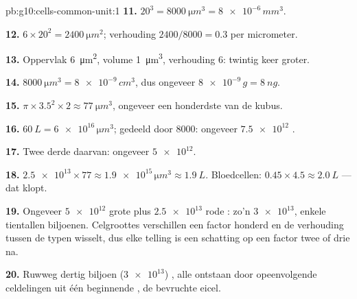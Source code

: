 \begin{solution}{pb:g10:cells-common-unit:1}
\textbf{11.} $20^3 = \qty{8000}{\micro m^3} = \num{8e-6}\,\unit{mm^3}$.

\textbf{12.} $6 \times 20^2 = \qty{2400}{\micro m^2}$; verhouding
$2400/8000 = 0.3$ per micrometer.

\textbf{13.} Oppervlak \qty{6}{\micro m^2}, volume \qty{1}{\micro m^3},
verhouding 6: twintig keer groter.

\textbf{14.} $\qty{8000}{\micro m^3} = \num{8e-9}\,\unit{cm^3}$, dus
ongeveer $\num{8e-9}\,\unit{g} = \qty{8}{ng}$.

\textbf{15.} $\pi \times 3.5^2 \times 2 \approx \qty{77}{\micro m^3}$,
ongeveer een honderdste van de kubus.

\textbf{16.} $\qty{60}{L} = \num{6e16}\,\unit{\micro m^3}$; gedeeld door
8000: ongeveer $\num{7.5e12}$ .

\textbf{17.} Twee derde daarvan: ongeveer $\num{5e12}$.

\textbf{18.} $\num{2.5e13} \times 77 \approx \num{1.9e15}\,\unit{\micro
m^3} \approx \qty{1.9}{L}$. Bloedcellen: $0.45 \times 4.5 \approx
\qty{2.0}{L}$ --- dat klopt.

\textbf{19.} Ongeveer $\num{5e12}$ grote  plus $\num{2.5e13}$ rode
: zo'n $\num{3e13}$, enkele tientallen biljoenen. Celgroottes
verschillen een factor honderd en de verhouding tussen de typen
wisselt, dus elke telling is een schatting op een factor twee of drie na.

\textbf{20.} Ruwweg dertig biljoen ($\num{3e13}$) , alle ontstaan
door opeenvolgende celdelingen uit één beginnende , de bevruchte
eicel.
\end{solution}
